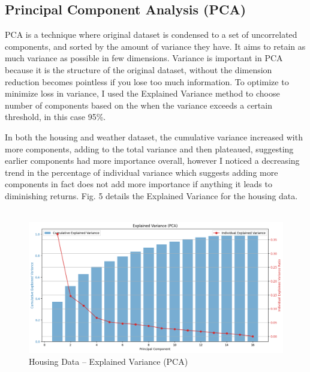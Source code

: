 \documentclass[conference]{IEEEtran}
\begin{document}
\subsection{Principal Component Analysis (PCA)}
\par PCA is a technique where original dataset is condensed to a set of uncorrelated components, and sorted by the amount of variance they have. It aims to retain as much variance as possible in few dimensions. Variance is important in PCA because it is the structure of the original dataset, without the dimension reduction becomes pointless if you lose too much information. To optimize to minimize loss in variance, I used the Explained Variance method to choose number of components based on the when the variance exceeds a certain threshold, in this case 95\%.
\par In both the housing and weather dataset, the cumulative variance increased with more components, adding to the total variance and then plateaued, suggesting earlier components had more importance overall, however I noticed a decreasing trend in the percentage of individual variance which suggests adding more components in fact does not add more importance if anything it leads to diminishing returns. Fig. 5 details the Explained Variance for the housing data.\\\\
\begin{figure}
    \centering
    \includegraphics[width=1.0\linewidth]{figures//housing_figures/step_2a.png}
    \caption{Housing Data -- Explained Variance (PCA)}
    \label{fig:5_housing_ExpVariance
}
\end{figure}
\end{document}
